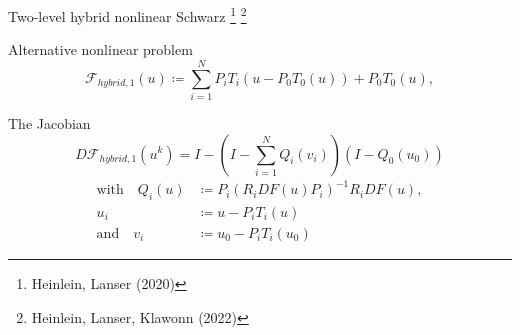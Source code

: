 \begin{frame}{Two-level hybrid nonlinear Schwarz  \footnote[2]{\tiny Heinlein, Lanser (2020)} \footnote[3]{\tiny Heinlein, Lanser, Klawonn (2022)}}
	\vspace*{-5mm}
	\begin{block}{\normalsize Alternative nonlinear problem}
		\begin{equation*}
			\mathcal{F}_{hybrid,1}(u) \coloneqq \sum_{i=1}^NP_iT_i(u-P_0T_0(u)) + P_0T_0(u),
		\end{equation*}
	\end{block}
	\begin{block}{\normalsize The Jacobian}
		\vspace*{-2mm}
		\begin{equation*}
			D\mathcal{F}_{hybrid,1}(u^k) = I - \left(I-\sum_{i=1}^NQ_i(v_i)\right)(I-Q_0(u_0))
		\end{equation*}
		\begin{align*}
			\text{with}\quad Q_i(u) & \coloneqq P_i(R_iDF(u)P_i)^{-1}R_iDF(u), \\
			u_i                     & \coloneqq u-P_iT_i(u)                    \\
			\text{and}\quad v_i     & \coloneqq u_0-P_iT_i(u_0)
		\end{align*}
	\end{block}
\end{frame}
